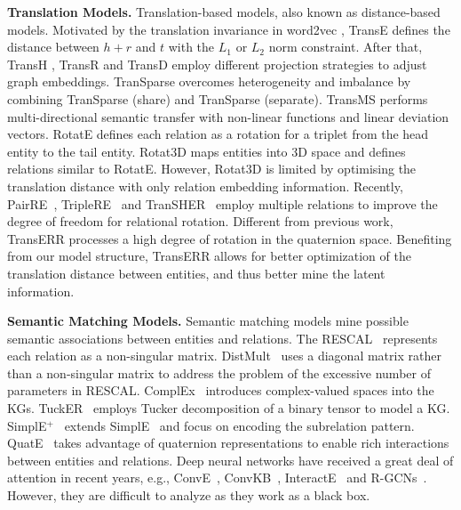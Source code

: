 \documentclass[11pt]{article}
\begin{document}
\textbf{Translation Models.} Translation-based models, also known as distance-based models. Motivated by the translation invariance in word2vec \cite{19mikolov2013efficient}, TransE \cite{7bordes2013translating}  defines the distance between $h + r$ and $t$  with the $L_1$ or $L_2$ norm constraint. After that, TransH \cite{81wang2014knowledge}, TransR \cite{9lin2015learning} and TransD \cite{10ji2015knowledge}  employ different projection strategies to adjust graph embeddings. TranSparse \cite{20ji2016knowledge} overcomes heterogeneity and imbalance by combining TranSparse (share) and TranSparse (separate). TransMS \cite{21yang2019transms} performs multi-directional semantic transfer with non-linear functions and linear deviation vectors. RotatE \cite{31sun2019rotate} defines each relation as a rotation for a triplet from the head entity to the tail entity. Rotat3D \cite{15gao2020rotate3d} maps entities into 3D space and defines relations similar to RotatE. However, Rotat3D is limited by optimising the translation distance with only relation embedding information. Recently, PairRE~\cite{52chao2020pairre}, TripleRE~\cite{yu2022triplere} and TranSHER~\cite{li-etal-2022-transher} employ multiple relations to improve the degree of freedom for relational rotation. Different from previous work, TransERR processes a high degree of rotation in the quaternion space.  Benefiting from our model structure, TransERR allows for better optimization of the translation distance between entities, and thus better mine the latent information.





\textbf{Semantic Matching Models.}
Semantic matching  models mine possible semantic associations between entities and relations. The RESCAL~\cite{27nickel2011three} represents each relation as a non-singular matrix. DistMult~\cite{29yang2014embedding} uses a diagonal matrix rather than a non-singular matrix to address the problem of the excessive number of parameters in RESCAL. ComplEx~\cite{14trouillon2016complex} introduces complex-valued spaces into the KGs. TuckER~\cite{TuckER2019tucker} employs Tucker decomposition of a binary tensor to model a KG. SimplE$^+$~\cite{58fatemi2019improved} extends SimplE~\cite{kazemi2018simple} and focus on encoding the subrelation pattern. QuatE~\cite{zhang2019quaternion} takes advantage of quaternion representations to enable rich interactions between entities and relations. Deep neural networks have received a great deal of attention in recent years, e.g., ConvE~\cite{dettmers2018convolutional}, ConvKB~\cite{nguyen2017novel}, InteractE~\cite{vashishth2020interacte} and R-GCNs~\cite{schlichtkrull2018modeling}. However, they are difficult to analyze as they work as a black box.
\end{document}
